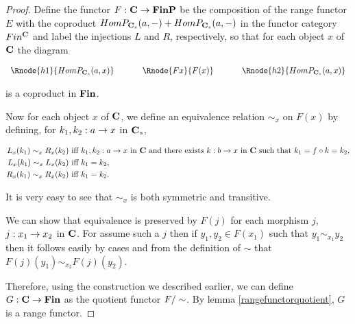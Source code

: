 \begin{proof}
Define the functor $F: \textbf{C} \rightarrow \textbf{FinP}$ be the
composition of the range functor $E$ with the 
coproduct $HomP_{\textbf{C}_s}(a,-) + HomP_{\textbf{C}_s}(a,-)$
in the functor category $Fin^{\textbf{C}}$ and label the injections $L$ and $R$, respectively,
so that for each object $x$ of $\textbf{C}$ the diagram
\begin{center}
$
\begin{array}{c p{0.5cm} c p{0.5cm} c  }
\Rnode{h1}{HomP_{\catc_s}(a,x)}  &&\Rnode{Fx}{F(x)}  &&   \Rnode{h2}{HomP_{\catc_s}(a,x)}       
\end{array} 
$
\end{center}
is a coproduct in $\textbf{Fin}$. 

Now for each object $x$ of $\textbf{C}$, we define an equivalence relation $\sim_x$ on $F(x)$ by defining,
for $k_1,k_2:a \rightarrow x$ in $\textbf{C}_s$,

\begin{align*}
L_x(k_1) \sim_x R_x(k_2) & \mbox{ iff $k_1,k_2:a \rightarrow x$ in $\textbf{C}$ 
                                     and there exists $k:b \rightarrow x$ in $\textbf{C}$ such that $k_1 = f \circ k = k_2$,}\\
L_x(k_1) \sim_x L_x(k_2) & \mbox{ iff $k_1 = k_2$,} \\
R_x(k_1) \sim_x R_x(k_2) & \mbox{ iff $k_1 = k_2$.} \\
\end{align*}

It is very easy to see that $\sim_x$  is both symmetric and transitive. 

We can show that equivalence is preserved by  $F(j)$ for each morphism $j$, $j: x_1 \rightarrow x_2$ in $\textbf{C}$. For assume such a $j$ then 
if $y_1,y_2 \in F(x_1)$ such that $y_1 \sim_{x_1} y_2$
then it follows easily by cases and from the definition of $\sim$ that $F(j)(y_1) \sim_{x_2} F(j)(y_2)$. 

Therefore,                using the construction we described earlier, 
we can define 
 $G: \textbf{C} \rightarrow \textbf{Fin}$  as the quotient functor $F/\sim$.
By lemma \ref{rangefunctorquotient}, $G$ is a range functor.


\end{proof}
